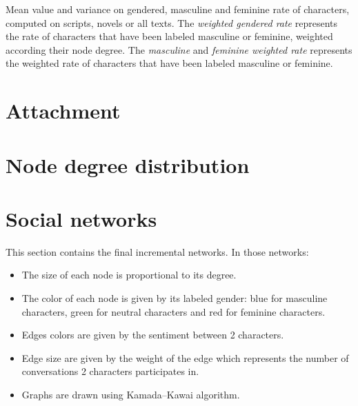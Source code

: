 \documentclass[a4paper, 12pt]{report}
\begin{document}
\begin{appendices}
\begin{table}[]
\caption{Mean value and variance on gendered, masculine and feminine rate of characters, computed on scripts, novels or all texts. The \textit{weighted gendered rate} represents the rate of characters that have been labeled masculine or feminine, weighted according their node degree. The \textit{masculine} and \textit{feminine weighted rate} represents the weighted rate of characters that have been labeled masculine or feminine. }
 \label{gender_all_weighted}
\end{table}












\chapter{Attachment}
\label{ref_attachement}





\chapter{Node degree distribution}
\label{a_degree}







\chapter{Social networks}
This section contains the final incremental networks. In those networks:
\begin{itemize}
\item The size of each node is proportional to its degree.
\item The color of each node is given by its labeled gender: blue for masculine characters, green for neutral characters and red for feminine characters.
\item Edges colors are given by the sentiment between 2 characters.
\item Edge size are given by the weight of the edge which represents the number of conversations 2 characters participates in.
\item Graphs are drawn using Kamada–Kawai algorithm. 
\end{itemize}
\label{final_sn}



\end{appendices}
\end{document}
